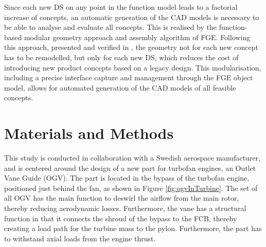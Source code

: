 \documentclass[preprints,article,accept,moreauthors,pdftex]{Definitions/mdpi}
\begin{document}

Since each new \ac{DS} on any point in the function model leads to a factorial increase of concepts, an automatic generation of the CAD models is necessary to be able to analyse and evaluate all concepts.
This is realised by the function-based modular geometry approach and assembly algorithm of \ac{FGE}.
Following this approach, presented and verified in \cite{Muller2021FunctionVariants}, the geometry not for each new concept has to be remodelled, but only for each new DS, which reduces the cost of introducing new product concepts based on a legacy design.
This modularisation, including a precise interface capture and management through the \ac{FGE} object model, allows for automated generation of the CAD models of all feasible concepts.



\section{Materials and Methods}\label{sec:method}
This study is conducted in collaboration with a Swedish aerospace manufacturer, and is centered around the design of a new part for turbofan engines, an Outlet Vane Guide (\ac{OGV}).
The part is located in the bypass of the turbofan engine, positioned just behind the fan, as shown in Figure \ref{fig:ogvInTurbine}.
The set of all \ac{OGV} has the main function to deswirl the airflow from the main rotor, thereby reducing aerodynamic losses.
Furthermore, the vane has a structural function in that it connects the shroud of the bypass to the \ac{FCB}, thereby creating a load path for the turbine mass to the pylon.
Furthermore, the part has to withstand axial loads from the engine thrust.
\end{document}
